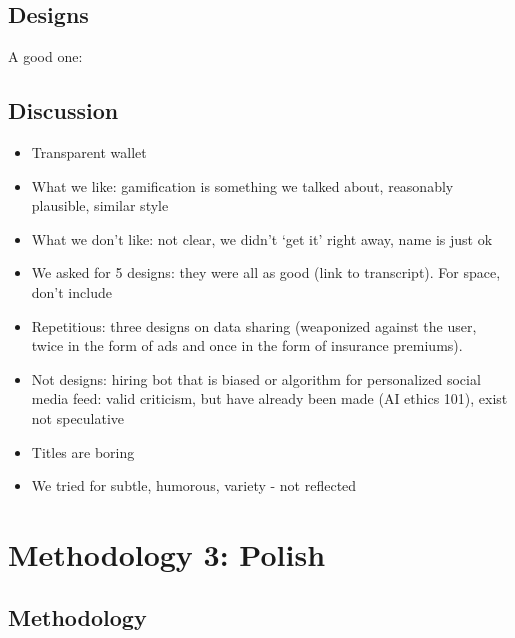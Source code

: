 \subsection{Designs}

A good one:




\subsection{Discussion}
\begin{itemize}
\item Transparent wallet
\item What we like: gamification is something we talked about, reasonably plausible, similar style
\item What we don't like: not clear, we didn't `get it' right away, name is just ok
\item We asked for 5 designs: they were all as good (link to transcript). For space, don't include
\item Repetitious: three designs on data sharing (weaponized against the user, twice in the form of ads and once in the form of insurance premiums). 
\item Not designs: hiring bot that is biased or algorithm for personalized social media feed: valid criticism, but have already been made (AI ethics 101), exist not speculative
\item Titles are boring
\item We tried for subtle, humorous, variety - not reflected

\end{itemize}

\section{Methodology 3: Polish}

\subsection{Methodology}

